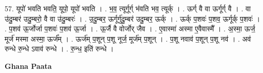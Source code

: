 \documentclass[17pt]{extarticle}
\begin{document}
57. यूपो॑ भवति भवति॒ यूपो॒ यूपो॑ भवति । . भ॒व॒ त्यूर्गूर्ग् भ॑वति भव॒ त्यूर्क् । . ऊर्ग् वै वा ऊर्गूर्ग् वै । . वा उ॑दु॒म्बर॑ उदु॒म्बरो॒ वै वा उ॑दु॒म्बरः॑ । . उ॒दु॒म्बर॒ ऊर्गूर्गु॑दु॒म्बर॑ उदु॒म्बर॒ ऊर्क् । . ऊर्क् प॒शवः॑ प॒शव॒ ऊर्गूर्क् प॒शवः॑ । . प॒शव॑ ऊ॒र्जोर्जा प॒शवः॑ प॒शव॑ ऊ॒र्जा । . ऊ॒र्जै वै वोर्जोर् जैव । . ए॒वास्मा॑ अस्मा ए॒वैवास्मै᳚ । . अ॒स्मा॒ ऊर्ज॒ मूर्ज॑ मस्मा अस्मा॒ ऊर्ज᳚म् । . ऊर्ज॑म् प॒शून् प॒शू नूर्ज॒ मूर्ज॑म् प॒शून् । . प॒शू नवाव॑ प॒शून् प॒शू नव॑ । . अव॑ रुन्धे रु॒न्धे ऽवाव॑ रुन्धे । . रु॒न्ध॒ इति॑ रुन्धे । \newline

\textbf{Ghana Paata } \newline
\end{document}
